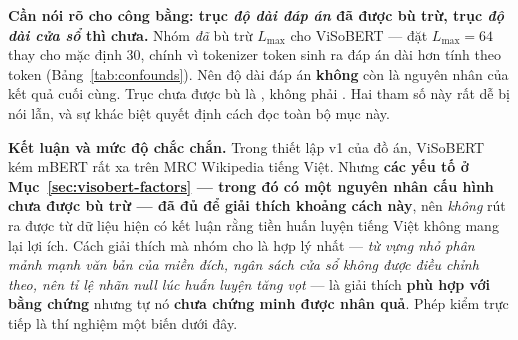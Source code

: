 \begin{warnbox}
\textbf{Cần nói rõ cho công bằng: trục \emph{độ dài đáp án} đã được bù trừ, trục \emph{độ dài
cửa sổ} thì chưa.} Nhóm \emph{đã} bù trừ $L_{\max}$ cho ViSoBERT --- 
đặt $L_{\max} = 64$ thay cho mặc định 30, chính vì tokenizer \tokVocabViso{} token sinh ra đáp án
dài hơn tính theo token (Bảng~\ref{tab:confounds}). Nên độ dài đáp án \textbf{không} còn là
nguyên nhân của kết quả cuối cùng. Trục chưa được bù là , không phải
. Hai tham số này rất dễ bị nói lẫn, và sự khác biệt quyết định cách đọc
toàn bộ mục này.
\end{warnbox}

\begin{keybox}
\textbf{Kết luận và mức độ chắc chắn.} Trong thiết lập v1 của đồ án, ViSoBERT kém mBERT rất xa
trên MRC Wikipedia tiếng Việt. Nhưng \textbf{các yếu tố ở Mục~\ref{sec:visobert-factors} --- trong
đó có một nguyên nhân cấu hình chưa được bù trừ --- đã đủ để giải thích khoảng cách này}, nên
\emph{không} rút ra được từ dữ liệu hiện có kết luận rằng tiền huấn luyện tiếng Việt không mang
lại lợi ích. Cách giải thích mà nhóm cho là hợp lý nhất --- \emph{từ vựng nhỏ phân mảnh mạnh văn
bản của miền đích, ngân sách cửa sổ không được điều chỉnh theo, nên tỉ lệ nhãn null lúc huấn luyện
tăng vọt} --- là giải thích \textbf{phù hợp với bằng chứng} nhưng tự nó \textbf{chưa chứng minh
được nhân quả}. Phép kiểm trực tiếp là thí nghiệm một biến dưới đây.
\end{keybox}

